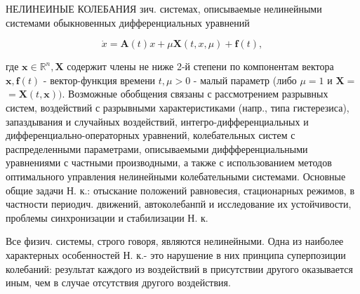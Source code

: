 \documentclass[10pt]{article}
\begin{document}
НЕЛИНЕИНЫЕ КОЛЕБАНИЯ зич. системах, описываемые нелинейными системами обыкновенных дифференциальных уравнений



\[

\dot{x}=\boldsymbol{A}(t) x+\mu \boldsymbol{X}(t, x, \mu)+\boldsymbol{f}(t),

\]



где $\boldsymbol{x} \in \mathbb{R}^{n}, \boldsymbol{X}$ содержит члены не ниже 2-й степени по компонентам вектора $\boldsymbol{x}, \boldsymbol{f}(t)$ - вектор-функция времени $t, \mu>0$ - малый параметр (либо $\mu=1$ и $\boldsymbol{X}=$ $=\boldsymbol{X}(t, \boldsymbol{x}))$. Возможные обобщения связаны с рассмотрением разрывных систем, воздействий с разрывными характеристиками (напр., типа гистерезиса), запаздывания и случайных воздействий, интегро-дифференциальных и дифференциально-операторных уравнений, колебательных систем с распределенными параметрами, описываемыми диффференциальными уравнениями с частными производными, а также с использованием методов оптимального управления нелинейными колебательными системами. Основные общие задачи Н. к.: отыскание положений равновесия, стационарных режимов, в частности периодич. движений, автоколебанпй и исследование их устойчивости, проблемы синхронизации и стабилизации Н. к.



Все физич. системы, строго говоря, являются нелинейными. Одна из наиболее характерных особенностей Н. к.- это нарушение в них принципа суперпозиции колебаний: результат каждого из воздействий в присутствии другого оказывается иным, чем в случае отсутствия другого воздействия.
\end{document}
